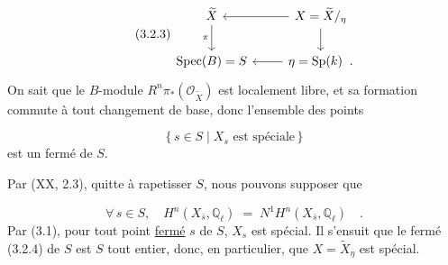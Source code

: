 \begin{equation}\tag{3.2.3}
\begin{tikzcd}
\widetilde{X} \arrow[d, "\pi"'] & X = \widetilde{X}/_{\eta} \arrow[l] \arrow[d] \\
\mathrm{Spec}(B) = S & \eta = \mathrm{Sp}(k) \;\; . \arrow[l]
\end{tikzcd}
\end{equation}
On sait que le $B$-module $R^n\pi_*(\mathcal{O}_{\widetilde{X}})$ est localement libre, et sa formation commute à tout changement de base, donc l'ensemble des points 



\begin{equation}\tag{3.2.4}
 \{\, s \in S \mid X_s \text{ est spéciale} \,\}
\end{equation}
est un fermé de $S$.

Par (XX, 2.3), quitte à rapetisser $S$, nous pouvons supposer que

\begin{equation}\tag{3.2.5}
\forall\, s \in S, \quad H^n(X_{\bar{s}}, \mathbb{Q}_\ell) \;=\; N^1 H^n(X_{\bar{s}}, \mathbb{Q}_\ell) \quad .
\end{equation}
Par (3.1), pour tout point \underline{fermé} $s$ de $S$, $X_s$ est spécial. Il s'ensuit que le fermé (3.2.4) de $S$ est $S$ tout entier, donc, en particulier, que $X = \tilde{X}_\eta$ est spécial.


